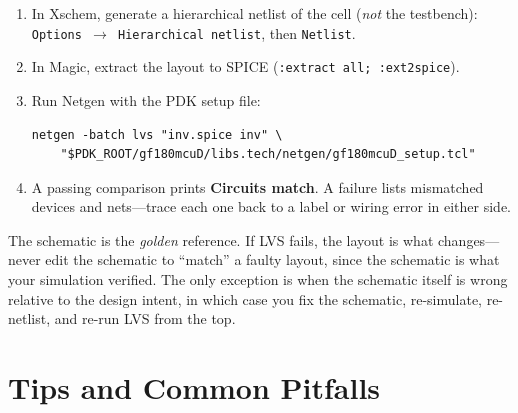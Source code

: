 \documentclass[11pt]{article}
\begin{document}
\begin{enumerate}[leftmargin=2em]
  \item In Xschem, generate a hierarchical netlist of the cell
        (\emph{not} the testbench): \texttt{Options $\rightarrow$
        Hierarchical netlist}, then \texttt{Netlist}.
  \item In Magic, extract the layout to SPICE
        (\texttt{:extract all; :ext2spice}).
  \item Run Netgen with the PDK setup file:
\begin{lstlisting}
netgen -batch lvs "inv.spice inv" \
    "$PDK_ROOT/gf180mcuD/libs.tech/netgen/gf180mcuD_setup.tcl"
\end{lstlisting}
  \item A passing comparison prints \textbf{Circuits match}.
        A failure lists mismatched devices and nets---trace each one
        back to a label or wiring error in either side.
\end{enumerate}

\begin{tipbox}
The schematic is the \emph{golden} reference.
If LVS fails, the layout is what changes---never edit the schematic to
``match'' a faulty layout, since the schematic is what your simulation
verified.
The only exception is when the schematic itself is wrong relative to
the design intent, in which case you fix the schematic, re-simulate,
re-netlist, and re-run LVS from the top.
\end{tipbox}

\section{Tips and Common Pitfalls}
\end{document}
